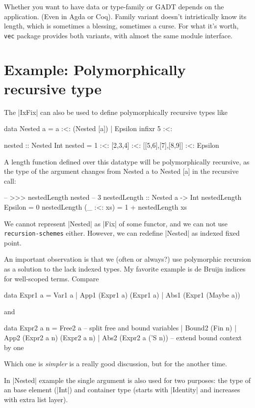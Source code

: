 Whether you want to have data or type-family or GADT depends on the application.
(Even in Agda or Coq). Family variant doesn't intristically know its length,
which is sometimes a blessing, sometimes a curse.
For what it's worth, \texttt{vec} package provides both variants,
with almost the same module interface.

\section{Example: Polymorphically recursive type}

The |IxFix| can also be used to define polymorphically recursive types like

\begin{code}
data Nested a = a :<: (Nested [a]) | Epsilon
infixr 5 :<:

nested :: Nested Int
nested = 1 :<: [2,3,4] :<: [[5,6],[7],[8,9]] :<: Epsilon
\end{code}

A length function defined over this datatype will be polymorphically recursive,
as the type of the argument changes from Nested a to Nested [a] in the recursive call:

\begin{code}
-- >>> nestedLength nested
-- 3
nestedLength :: Nested a -> Int
nestedLength Epsilon    = 0
nestedLength (_ :<: xs) = 1 + nestedLength xs
\end{code}

We cannot represent |Nested| as |Fix| of some functor,
and we can not use \texttt{recursion-schemes} either.
However, we can redefine |Nested| as indexed fixed point.

An important observation is that we (often or always?) use polymorphic recursion
as a solution to the lack indexed types.
My favorite example is de Bruijn indices for well-scoped terms.
Compare
\begin{code}
data Expr1 a
    = Var1 a
    | App1 (Expr1 a) (Expr1 a)
    | Abs1 (Expr1 (Maybe a))
\end{code}
and
\begin{code}
data Expr2 a n
    = Free2 a                -- split free and bound variables
    | Bound2 (Fin n)
    | App2 (Expr2 a n) (Expr2 a n)
    | Abs2 (Expr2 a ('S n))  -- extend bound context by one
\end{code}
Which one is \emph{simpler} is a really good discussion,
but for the another time.

In |Nested| example the single argument is also used for two
purposes: the type of an base element (|Int|) and container type
(starts with |Identity| and increases with extra list layer).

